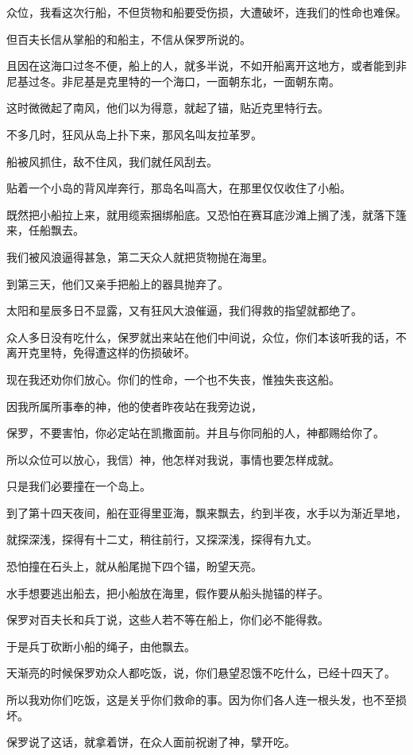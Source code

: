\documentclass[12pt,oneside]{book}
\begin{document}
众位，我看这次行船，不但货物和船要受伤损，大遭破坏，连我们的性命也难保。

但百夫长信从掌船的和船主，不信从保罗所说的。

且因在这海口过冬不便，船上的人，就多半说，不如开船离开这地方，或者能到非尼基过冬。非尼基是克里特的一个海口，一面朝东北，一面朝东南。

这时微微起了南风，他们以为得意，就起了锚，贴近克里特行去。

不多几时，狂风从岛上扑下来，那风名叫友拉革罗。

船被风抓住，敌不住风，我们就任风刮去。

贴着一个小岛的背风岸奔行，那岛名叫高大，在那里仅仅收住了小船。

既然把小船拉上来，就用缆索捆绑船底。又恐怕在赛耳底沙滩上搁了浅，就落下篷来，任船飘去。

我们被风浪逼得甚急，第二天众人就把货物抛在海里。

到第三天，他们又亲手把船上的器具抛弃了。

太阳和星辰多日不显露，又有狂风大浪催逼，我们得救的指望就都绝了。

众人多日没有吃什么，保罗就出来站在他们中间说，众位，你们本该听我的话，不离开克里特，免得遭这样的伤损破坏。

现在我还劝你们放心。你们的性命，一个也不失丧，惟独失丧这船。

因我所属所事奉的神，他的使者昨夜站在我旁边说，

保罗，不要害怕，你必定站在凯撒面前。并且与你同船的人，神都赐给你了。

所以众位可以放心，我信）神，他怎样对我说，事情也要怎样成就。

只是我们必要撞在一个岛上。

到了第十四天夜间，船在亚得里亚海，飘来飘去，约到半夜，水手以为渐近旱地，

就探深浅，探得有十二丈，稍往前行，又探深浅，探得有九丈。

恐怕撞在石头上，就从船尾抛下四个锚，盼望天亮。

水手想要逃出船去，把小船放在海里，假作要从船头抛锚的样子。

保罗对百夫长和兵丁说，这些人若不等在船上，你们必不能得救。

于是兵丁砍断小船的绳子，由他飘去。

天渐亮的时候保罗劝众人都吃饭，说，你们悬望忍饿不吃什么，已经十四天了。

所以我劝你们吃饭，这是关乎你们救命的事。因为你们各人连一根头发，也不至损坏。

保罗说了这话，就拿着饼，在众人面前祝谢了神，擘开吃。
\end{document}
